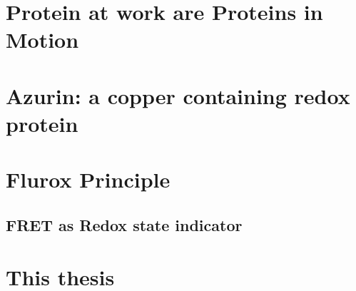 \documentclass[11pt,a4paper,onecolumn]{article}
\begin{document}
\section{Protein at work are Proteins in Motion}
\section{Azurin: a copper containing redox protein}
\section{Flurox Principle}
\subsection*{FRET as Redox state indicator}
%
\section{This thesis}


\end{document}
